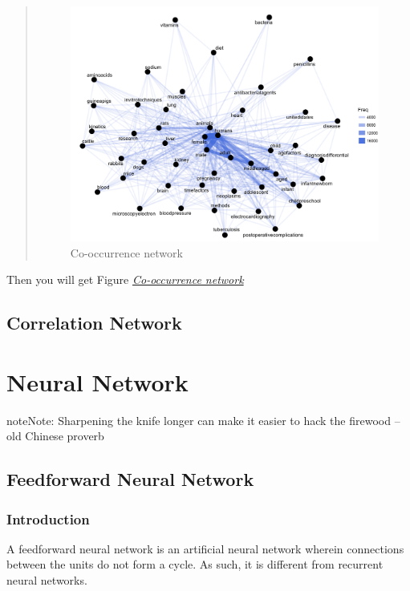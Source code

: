 \documentclass[letterpaper,11pt,english]{sphinxmanual}
\begin{document}
\begin{quote}
\begin{figure}[htbp]
\includegraphics{netfreq.png}
\caption{Co-occurrence network}\label{socialnetwork:fig-netfreq}\end{figure}
\end{quote}

Then you will get Figure {\hyperref[socialnetwork:fig-netfreq]{\emph{Co-occurrence network}}}


\section{Correlation Network}
\label{socialnetwork:correlation-network}

\chapter{Neural Network}
\label{fnn:yassine-alouini}\label{fnn::doc}\label{fnn:neural-network}\label{fnn:fnn}
\begin{notice}{note}{Note:}
Sharpening the knife longer can make it easier to hack the firewood -- old Chinese proverb
\end{notice}


\section{Feedforward Neural Network}
\label{fnn:feedforward-neural-network}

\subsection{Introduction}
\label{fnn:introduction}
A feedforward neural network is an artificial neural network wherein connections between the units do not form a cycle. As such, it is different from recurrent neural networks.
\end{document}
